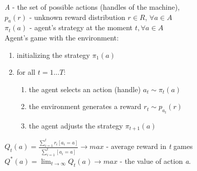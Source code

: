 \documentclass{article}
\begin{document}
\textit{A} - the set of possible actions (handles of the machine),\\
\textit{${p_{a}(r)}$} - unknown reward distribution ${r\in R}$, ${\forall a\in A}$ \\
\textit{${\pi_{t}(a)}$} - agent's strategy at the moment ${t, \forall a\in A}$ \\
Agent's game with the environment:
\begin{enumerate}
	\item initializing the strategy ${\pi_{1}(a)}$
	\item for all ${t=1...T}$:
	\begin{enumerate}
		\item the agent selects an action (handle) ${a_{t}\sim\pi_{t}(a)}$
		\item the environment generates a reward ${r_{t}\sim p_{a_{t}}(r)}$
		\item the agent adjusts the strategy ${\pi_{t+1}(a)}$
	\end{enumerate}
\end{enumerate}
${Q_{t}(a)=\frac{\sum_{i=1}^{t}r_{i}[a_{i}=a]}{\sum_{i=1}^{t}[a_{i}=a]}\rightarrow max}$ - average reward in \textit{t} games\\
${Q^{*}(a)=\lim_{t\rightarrow\infty}Q_{t}(a)\rightarrow max}$ - the value of action \textit{a}.\\

 
 
\end{document}
